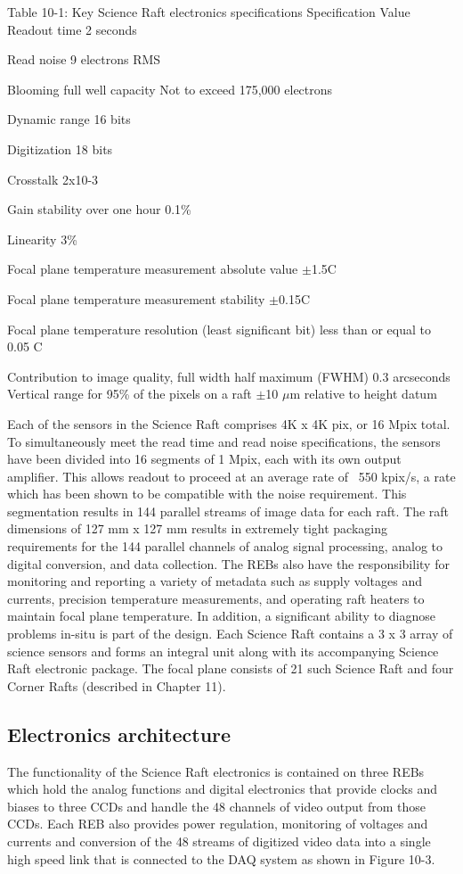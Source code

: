 Table 10-1: Key Science Raft electronics specifications
Specification 	Value 
Readout time 	2 seconds  

Read noise 	9 electrons RMS 

Blooming full well capacity 	Not to exceed 175,000 electrons 

Dynamic range 	16 bits 

Digitization	18 bits

Crosstalk 	2x10-3  

Gain stability over one hour
0.1\% 

Linearity	3\% 

Focal plane temperature measurement absolute value 	$\pm$1.5C 

Focal plane temperature measurement stability 	$\pm$0.15C 

Focal plane temperature resolution (least significant bit) 
less than or equal to 0.05 C 

Contribution to image quality, full width half maximum (FWHM)	0.3 arcseconds
Vertical range for 95\% of the pixels on a raft	$\pm$10 $\mu$m relative to height datum

Each of the sensors in the Science Raft comprises 4K x 4K pix, or 16 Mpix total. To simultaneously meet the read time and read noise specifications, the sensors have been divided into 16 segments of 1 Mpix, each with its own output amplifier. This allows readout to proceed at an average rate of ~550 kpix/s, a rate which has been shown to be compatible with the noise requirement. This segmentation results in 144 parallel streams of image data for each raft. The raft dimensions of 127 mm x 127 mm results in extremely tight packaging requirements for the 144 parallel channels of analog signal processing, analog to digital conversion, and data collection. 
The REBs also have the responsibility for monitoring and reporting a variety of metadata such as supply voltages and currents, precision temperature measurements, and operating raft heaters to maintain focal plane temperature. In addition, a significant ability to diagnose problems in-situ is part of the design. 
Each Science Raft contains a 3 x 3 array of science sensors and forms an integral unit along with its accompanying Science Raft electronic package. The focal plane consists of 21 such Science Raft and four Corner Rafts (described in Chapter 11). 

\subsection{Electronics architecture}
The functionality of the Science Raft electronics is contained on three REBs which hold the analog functions and digital electronics that provide clocks and biases to three CCDs and handle the 48 channels of video output from those CCDs. Each REB also provides power regulation, monitoring of voltages and currents and conversion of the 48 streams of digitized video data into a single high speed link that is connected to the DAQ system as shown in Figure 10-3. 
 
